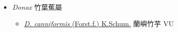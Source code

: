 
  \begin{itemize}
 \item[] \textit{Donax} 竹葉蕉屬
                    
  \begin{itemize}
        \item[] \href{http://www.theplantlist.org/tpl1.1/search?q=Donax+canniformis}{\textit{D. canniformis} (Forst.f.) K.Schum.}   蘭嶼竹芋 VU
  \end{itemize}
  \end{itemize}
